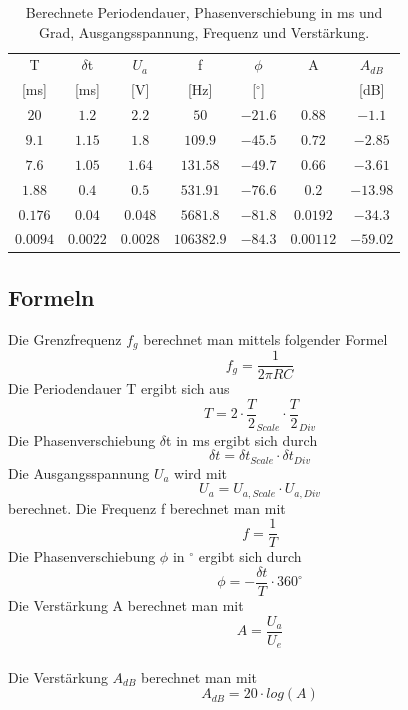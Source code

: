 \documentclass[12pt,a4paper,ngerman]{article}
\begin{document}
\begin{table}[H]
\begin{center}
\begin{tabular}{ |c|c|c|c|c|c|c| }
  \hline
    T & $\delta$t & $U_a$ & f & $\phi$ & A & $A_{dB}$\\

    [ms] & [ms] & [V] & [Hz] & [$^\circ$] & & [dB]\\
  \hline
$20$ & $1.2$ & $2.2$ & $50$ & $-21.6$ & $0.88$ & $-1.1$\\
  \hline
$9.1$ & $1.15$ & $1.8$ & $109.9$ & $-45.5$ & $0.72$ & $-2.85$\\
  \hline
$7.6$ & $1.05$ & $1.64$ & $131.58$ & $-49.7$ & $0.66$ & $-3.61$\\
  \hline
$1.88$ & $0.4$ & $0.5$ & $531.91$ & $-76.6$ & $0.2$ & $-13.98$\\
  \hline
$0.176$ & $0.04$ & $0.048$ & $5681.8$ & $-81.8$ & $0.0192$ & $-34.3$\\
  \hline
$0.0094$ & $0.0022$ & $0.0028$ & $106382.9$ & $-84.3$ & $0.00112$ & $-59.02$\\
  \hline
\end{tabular}
\caption{Berechnete Periodendauer, Phasenverschiebung in ms und Grad, Ausgangsspannung, Frequenz und Verstärkung.}
\end{center}
\label{tab:2_ber}
\end{table}

\subsection{Formeln}
Die Grenzfrequenz $f_g$ berechnet man mittels folgender Formel
\begin{equation}
f_g = \frac{1}{2 \pi RC}
\end{equation}
Die Periodendauer T ergibt sich aus
\begin{equation}
T = 2 \cdot \frac{T}{2}_{Scale} \cdot \frac{T}{2}_{Div}
\end{equation}
Die Phasenverschiebung $\delta$t in ms ergibt sich durch
\begin{equation}
\delta t = \delta t_{Scale} \cdot \delta t_{Div}
\end{equation}
Die Ausgangsspannung $U_a$ wird mit
\begin{equation}
U_a = U_{a,Scale} \cdot U_{a,Div}
\end{equation}
berechnet.
Die Frequenz f berechnet man mit
\begin{equation}
f = \frac{1}{T}
\end{equation}
Die Phasenverschiebung $\phi$ in $^\circ$ ergibt sich durch
\begin{equation}
\phi = - \frac{\delta t}{T} \cdot 360^\circ
\end{equation}
Die Verstärkung A berechnet man mit
\begin{equation}
A = \frac{U_a}{U_e}
\end{equation}\\
Die Verstärkung $A_{dB}$ berechnet man mit
\begin{equation}
A_{dB} = 20 \cdot log(A)
\end{equation}
\end{document}
